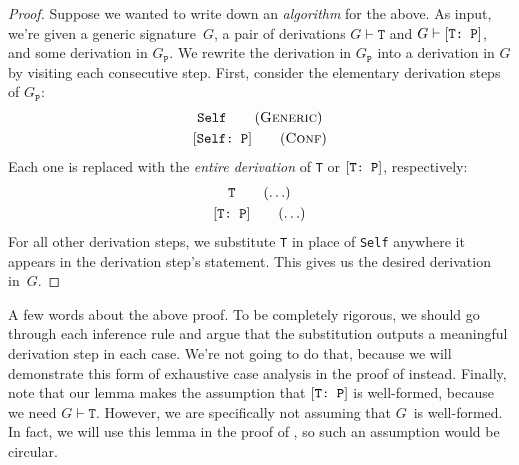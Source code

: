 \documentclass[../generics]{subfiles}
\begin{document}
\begin{proof}
Suppose we wanted to write down an \emph{algorithm} for the above. As input, we're given a generic signature~$G$, a pair of derivations $G\vdash\texttt{T}$ and $G\vdash[\texttt{T:~P}]$, and some derivation in $G_\texttt{P}$. We rewrite the derivation in $G_\texttt{P}$ into a derivation in $G$ by visiting each consecutive step. First, consider the elementary derivation steps of $G_\texttt{P}$:
\begin{gather*}
\texttt{Self}\tag{\textsc{Generic}}\\
\ConfReq{Self}{P}\tag{\textsc{Conf}}
\end{gather*}
Each one is replaced with the \emph{entire derivation} of \texttt{T} or $[\texttt{T:~P}]$, respectively:
\begin{gather*}
\texttt{T}\tag{$\ldots$}\\
\ConfReq{T}{P}\tag{$\ldots$}
\end{gather*}
For all other derivation steps, we substitute \texttt{T} in place of \texttt{Self} anywhere it appears in the derivation step's statement. This gives us the desired derivation in~$G$.
\end{proof}
A few words about the above proof. To be completely rigorous, we should go through each inference rule and argue that the substitution outputs a meaningful derivation step in each case. We're not going to do that, because we will demonstrate this form of exhaustive case analysis in the proof of  instead. Finally, note that our lemma makes the assumption that $[\texttt{T:~P}]$ is well-formed, because we need $G\vdash\texttt{T}$. However, we are specifically not assuming that $G$~is well-formed. In fact, we will use this lemma in the proof of , so such an assumption would be circular.
\end{document}
